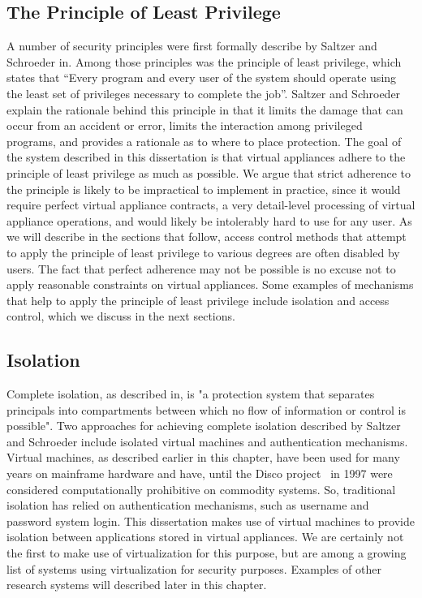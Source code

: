 \subsection{The Principle of Least Privilege}

A number of security principles were first formally describe by Saltzer and Schroeder in\cite{saltzer_1975}. Among those principles was the principle of least privilege, which states that ``Every program and every user of the system should operate using the least set of privileges necessary to complete the job''. Saltzer and Schroeder explain the rationale behind this principle in that it limits the damage that can occur from an accident or error, limits the interaction among privileged programs, and provides a rationale as to where to place protection. The goal of the system described in this dissertation is that virtual appliances adhere to the principle of least privilege as much as possible. We argue that strict adherence to the principle is likely to be impractical to implement in practice, since it would require perfect virtual appliance contracts, a very detail-level processing of virtual appliance operations, and would likely be intolerably hard to use for any user. As we will describe in the sections that follow, access control methods that attempt to apply the principle of least privilege to various degrees are often disabled by users. The fact that perfect adherence may not be possible is no excuse not to apply reasonable constraints on virtual appliances. Some examples of mechanisms that help to apply the principle of least privilege include isolation and access control, which we discuss in the next sections.


\subsection{Isolation}

Complete isolation, as described in\cite{saltzer_1975}, is "a protection system that separates principals into compartments between which no flow of information or control is possible". Two approaches for achieving complete isolation described by Saltzer and Schroeder include isolated virtual machines and authentication mechanisms. Virtual machines, as described earlier in this chapter, have been used for many years on mainframe hardware and have, until the Disco project~\cite{bugnion_1997} in 1997 were considered computationally prohibitive on commodity systems. So, traditional isolation has relied on authentication mechanisms, such as username and password system login. This dissertation makes use of virtual machines to provide isolation between applications stored in virtual appliances. We are certainly not the first to make use of virtualization for this purpose, but are among a growing list of systems using virtualization for security purposes. Examples of other research systems will described later in this chapter. 

